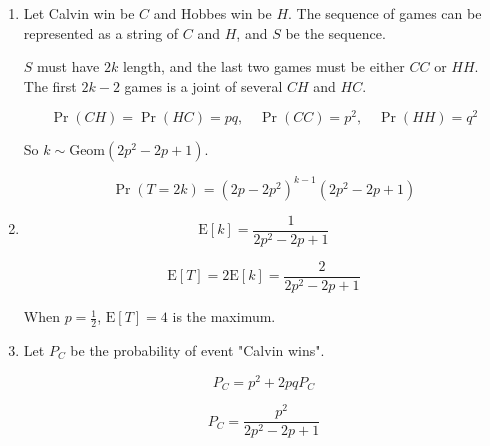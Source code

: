\documentclass[a4paper]{article}
\newcommand{\E}{\mathrm{E}}
\begin{document}
\begin{enumerate}
    \item[(a)]
    
    Let Calvin win be $C$ and Hobbes win be $H$. The sequence of games can be represented as a string of $C$ and $H$, and $S$ be the sequence.

    $S$ must have $2k$ length, and the last two games must be either $CC$ or $HH$. The first $2k-2$ games is a joint of several $CH$ and $HC$.

    $$
    \Pr(CH) = \Pr(HC) = pq
    ,\quad
    \Pr(CC) = p^2
    ,\quad
    \Pr(HH) = q^2
    $$

    So $k \sim \mathrm{Geom}(2p^2 - 2p + 1)$.

    $$
    \Pr(T=2k) = (2p - 2p^2)^{k-1}(2p^2 - 2p + 1)
    $$

    \item[(b)]
    
    $$
    \E[k] = \frac{1}{2p^2 - 2p + 1}
    $$

    $$
    \E[T] = 2\E[k] = \frac{2}{2p^2 - 2p + 1}
    $$

    When $p = \frac{1}{2}$, $\E[T] = 4$ is the maximum.

    \item[(c)]
    
    Let $P_C$ be the probability of event "Calvin wins".

    $$
    P_C = p^2 + 2pq P_C
    $$

    $$
    P_C = \frac{p^2}{2p^2 - 2p + 1}
    $$
\end{enumerate}
\end{document}
